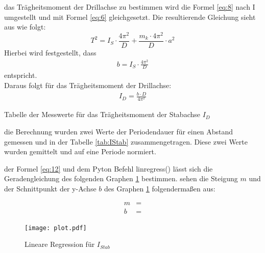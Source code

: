 \justifying das Trägheitsmoment der Drillachse zu bestimmen wird die Formel \eqref{eq:8} nach I umgestellt und mit Formel %
\eqref{eq:6} gleichgesetzt. Die resultierende Gleichung sieht aus wie folgt:
\begin{equation}
T^2 = I_S \cdot \frac{4\pi^2}{D} + \frac{m_k \cdot 4\pi^2}{D} \cdot a^2\label{eq:11}
\end{equation} 
Hierbei wird festgestellt, dass
\begin{align}
    b=I_S \cdot \frac{4\pi^2}{D} \label{eq:12}
\end{align}
entspricht.\\
Daraus folgt für das Trägheitsmoment der Drillachse:
\begin{align}
    I_D = \frac{b \cdot D}{4 \pi^2} \label{eq:13}
\end{align}

\begin{table}[H]
    \centering
    
    \caption{Tabelle der Messwerte für das Trägheitsmoment der Stabachse $I_D$}
    \label{tab:1}
\end{table}

 die Berechnung wurden zwei Werte der Periodendauer für einen Abstand gemessen und in der Tabelle \ref{tab:IStab}
zusammengetragen. Diese zwei Werte wurden gemittelt und auf eine Periode normiert.

\justifying der Formel \eqref{eq:12} und dem Pyton Befehl linregress() \cite{numpy} lässt sich die Geradengleichung
des folgenden Graphen \ref{fig:1} bestimmen. 
\justifying sehen die Steigung $m$ und der Schnittpunkt der y-Achse $b$ des Graphen \ref{fig:1} folgendermaßen aus:

\begin{subequations}
\begin{align}
m &= \text{}\label{eq:14a}\\
b &= \text{}\label{eq:14b}
\end{align}
\end{subequations}
\newpage

\begin{figure}[H]
    \centering
    \texttt{[image: plot.pdf]}
    \caption{Lineare Regression für $I_{Stab}$}
    \label{fig:1}
\end{figure}


